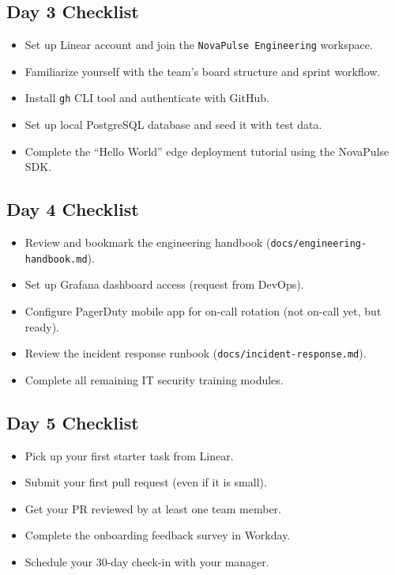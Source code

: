 \documentclass[
    language=english,
    doctype=onboarding-guide,
    institution=none,
]{../../omnilatex}
\begin{document}
\subsection{Day 3 Checklist}

\begin{itemize}
    \item[\(\square\)] Set up Linear account and join the
          \texttt{NovaPulse Engineering} workspace.
    \item[\(\square\)] Familiarize yourself with the team's board structure
          and sprint workflow.
    \item[\(\square\)] Install \texttt{gh} CLI tool and authenticate with
          GitHub.
    \item[\(\square\)] Set up local PostgreSQL database and seed it with
          test data.
    \item[\(\square\)] Complete the ``Hello World'' edge deployment tutorial
          using the NovaPulse SDK.
\end{itemize}

\subsection{Day 4 Checklist}

\begin{itemize}
    \item[\(\square\)] Review and bookmark the engineering handbook
          (\texttt{docs/engineering-handbook.md}).
    \item[\(\square\)] Set up Grafana dashboard access (request from DevOps).
    \item[\(\square\)] Configure PagerDuty mobile app for on-call rotation
          (not on-call yet, but ready).
    \item[\(\square\)] Review the incident response runbook
          (\texttt{docs/incident-response.md}).
    \item[\(\square\)] Complete all remaining IT security training modules.
\end{itemize}

\subsection{Day 5 Checklist}

\begin{itemize}
    \item[\(\square\)] Pick up your first starter task from Linear.
    \item[\(\square\)] Submit your first pull request (even if it is small).
    \item[\(\square\)] Get your PR reviewed by at least one team member.
    \item[\(\square\)] Complete the onboarding feedback survey in Workday.
    \item[\(\square\)] Schedule your 30-day check-in with your manager.
\end{itemize}
\end{document}
